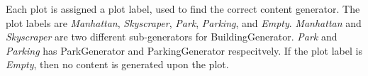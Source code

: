 Each plot is assigned a plot label, used to find the correct content generator.
The plot labels are \textit{Manhattan}, \textit{Skyscraper}, \textit{Park}, \textit{Parking}, and \textit{Empty}.
\textit{Manhattan} and \textit{Skyscraper} are two different sub-generators for BuildingGenerator. 
\textit{Park} and \textit{Parking} has ParkGenerator and ParkingGenerator respecitvely.
If the plot label is \textit{Empty}, then no content is generated upon the plot. 
